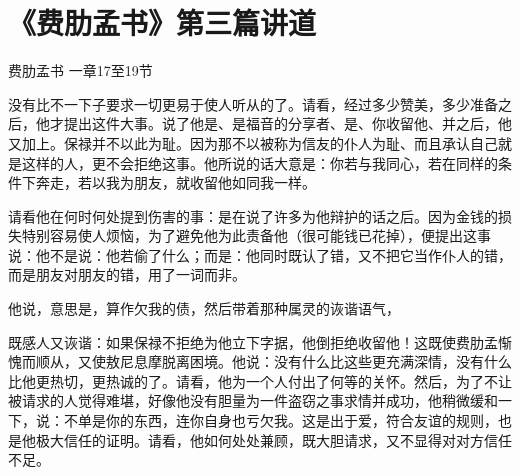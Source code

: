 

\section{《费肋孟书》第三篇讲道}

费肋孟书 一章17至19节 \par

\par

没有比不一下子要求一切更易于使人听从的了。请看，经过多少赞美，多少准备之后，他才提出这件大事。说了他是、是福音的分享者、是、你收留他、并之后，他又加上。保禄并不以此为耻。因为那不以被称为信友的仆人为耻、而且承认自己就是这样的人，更不会拒绝这事。他所说的话大意是：你若与我同心，若在同样的条件下奔走，若以我为朋友，就收留他如同我一样。\par

请看他在何时何处提到伤害的事：是在说了许多为他辩护的话之后。因为金钱的损失特别容易使人烦恼，为了避免他为此责备他（很可能钱已花掉），便提出这事说：他不是说：他若偷了什么；而是：他同时既认了错，又不把它当作仆人的错，而是朋友对朋友的错，用了一词而非。\par

他说，意思是，算作欠我的债，然后带着那种属灵的诙谐语气，\par

既感人又诙谐：如果保禄不拒绝为他立下字据，他倒拒绝收留他！这既使费肋孟惭愧而顺从，又使敖尼息摩脱离困境。他说：没有什么比这些更充满深情，没有什么比他更热切，更热诚的了。请看，他为一个人付出了何等的关怀。然后，为了不让被请求的人觉得难堪，好像他没有胆量为一件盗窃之事求情并成功，他稍微缓和一下，说：不单是你的东西，连你自身也亏欠我。这是出于爱，符合友谊的规则，也是他极大信任的证明。请看，他如何处处兼顾，既大胆请求，又不显得对对方信任不足。\par

